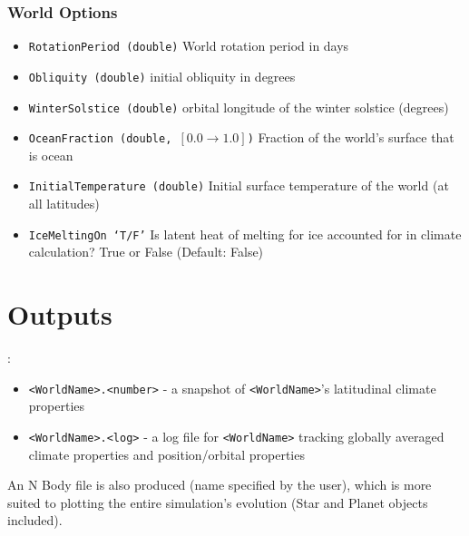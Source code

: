 \documentclass[usenatbib,11pt]{article}
\begin{document}
\subsubsection{World Options}

\begin{itemize}
\item{\texttt{RotationPeriod (double)}} World rotation period in days
\item{\texttt{Obliquity (double)}} initial obliquity in degrees
\item{\texttt{WinterSolstice (double)}} orbital longitude of the winter solstice (degrees)
\item{\texttt{OceanFraction (double, $[0.0 \rightarrow 1.0]$)}} Fraction of the world's surface that is ocean
\item{\texttt{InitialTemperature (double)}} Initial surface temperature of the world (at all latitudes)
\item{\texttt{IceMeltingOn `T/F'}} Is latent heat of melting for ice accounted for in climate calculation? True or False  (Default: False)
\end{itemize}

\section{Outputs}:

\begin{itemize}
\item{\texttt{<WorldName>.<number>}} - a  snapshot of \texttt{<WorldName>}'s latitudinal climate properties
\item{\texttt{<WorldName>.<log>}} - a log file for \texttt{<WorldName>} tracking globally averaged climate properties and position/orbital properties
\end{itemize}


An N Body file is also produced (name specified by the user), which is more suited to plotting the entire simulation's evolution (Star and Planet objects included).

%
%
\end{document}
